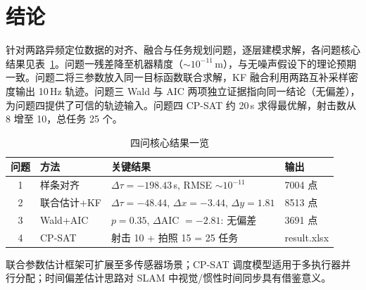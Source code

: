 \section{结论}\label{sec:conclusion}

针对两路异频定位数据的对齐、融合与任务规划问题，逐层建模求解，各问题核心结果见表~\ref{tab:conclusion_summary}。问题一残差降至机器精度（$\sim 10^{-11}$\,m），与无噪声假设下的理论预期一致。问题二将三参数放入同一目标函数联合求解，KF 融合利用两路互补采样密度输出 10\,Hz 轨迹。问题三 Wald 与 AIC 两项独立证据指向同一结论（无偏差），为问题四提供了可信的轨迹输入。问题四 CP-SAT 约 20\,s 求得最优解，射击数从 8 增至 10，总任务 25 个。

\begin{table}[H]
    \centering
    \caption{四问核心结果一览}
    \label{tab:conclusion_summary}
    \begin{tabular}{@{}clll@{}}
        \toprule
        问题 & 方法 & 关键结果 & 输出 \\
        \midrule
        1 & 样条对齐 & $\Delta\tau = -198.43$\,s, RMSE $\sim 10^{-11}$ & 7004 点 \\
        2 & 联合估计+KF & $\Delta\tau=-48.44$, $\Delta x=-3.44$, $\Delta y=1.81$ & 8513 点 \\
        3 & Wald+AIC & $p=0.35$, $\Delta$AIC $= -2.81$: 无偏差 & 3691 点 \\
        4 & CP-SAT & 射击 10 + 拍照 15 = 25 任务 & result.xlsx \\
        \bottomrule
    \end{tabular}
\end{table}

联合参数估计框架可扩展至多传感器场景；CP-SAT 调度模型适用于多执行器并行分配；时间偏差估计思路对 SLAM 中视觉/惯性时间同步具有借鉴意义。
